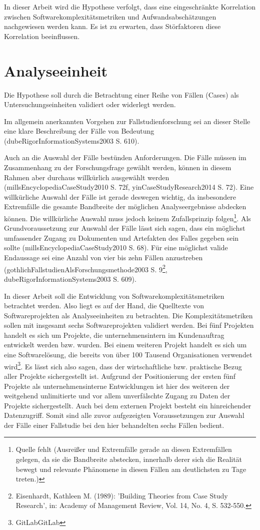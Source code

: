 In dieser Arbeit wird die Hypothese verfolgt, dass eine eingeschränkte
Korrelation zwischen Softwarekomplexitätsmetriken und
Aufwandsabschätzungen nachgewiesen werden kann. Es ist zu erwarten, dass
Störfaktoren diese Korrelation beeinflussen.

\section{Analyseeinheit}\label{analyseeinheit}

Die Hypothese soll durch die Betrachtung einer Reihe von Fällen (Cases)
als Untersuchungseinheiten validiert oder widerlegt werden.

Im allgemein anerkannten Vorgehen zur Fallstudienforschung sei an dieser
Stelle eine klare Beschreibung der Fälle von Bedeutung
(dubeRigorInformationSystems2003 S. 610).

Auch an die Auswahl der Fälle bestünden Anforderungen. Die Fälle müssen
im Zusammenhang zu der Forschungsfrage gewählt werden, können in diesem
Rahmen aber durchaus willkürlich ausgewählt werden
(millsEncyclopediaCaseStudy2010 S. 72f, yinCaseStudyResearch2014 S. 72).
Eine willkürliche Auswahl der Fälle ist gerade deswegen wichtig, da
insbesondere Extremfälle die gesamte Bandbreite der möglichen
Analyseergebnisse abdecken können. Die willkürliche Auswahl muss jedoch
keinem Zufallsprinzip folgen\footnote{Quelle fehlt (Ausreißer und
  Extremfälle gerade an diesen Extremfällen gelegen, da sie die
  Bandbreite abstecken, innerhalb derer sich die Realität bewegt und
  relevante Phänomene in diesen Fällen am deutlichsten zu Tage treten.)}.
Als Grundvoraussetzung zur Auswahl der Fälle lässt sich sagen, dass ein
möglichst umfassender Zugang zu Dokumenten und Artefakten des Falles
gegeben sein sollte (millsEncyclopediaCaseStudy2010 S. 68). Für eine
möglichst valide Endaussage sei eine Anzahl von vier bis zehn Fällen
anzustreben (gothlichFallstudienAlsForschungsmethode2003 S.
9\footnote{Eisenhardt, Kathleen M. (1989): 'Building Theories from Case
  Study Research', in: Academy of Management Review, Vol. 14, No. 4, S.
  532-550.}, dubeRigorInformationSystems2003 S. 609).

In dieser Arbeit soll die Entwicklung von Softwarekomplexitätsmetriken
betrachtet werden. Also liegt es auf der Hand, die Quelltexte von
Softwareprojekten als Analyseeinheiten zu betrachten. Die
Komplexitätsmetriken sollen mit insgesamt sechs Softwareprojekten
validiert werden. Bei fünf Projekten handelt es sich um Projekte, die
unternehmensintern im Kundenauftrag entwickelt werden bzw. wurden. Bei
einem weiteren Projekt handelt es sich um eine Softwarelösung, die
bereits von über 100 Tausend Organisationen verwendet wird\footnote{GitLabGitLab}.
Es lässt sich also sagen, dass der wirtschaftliche bzw. praktische Bezug
aller Projekte sichergestellt ist. Aufgrund der Positionierung der
ersten fünf Projekte als unternehmensinterne Entwicklungen ist hier des
weiteren der weitgehend unlimitierte und vor allem unverfälschte Zugang
zu Daten der Projekte sichergestellt. Auch bei dem externen Projekt
besteht ein hinreichender Datenzugriff. Somit sind alle zuvor
aufgezeigten Voraussetzungen zur Auswahl der Fälle einer Fallstudie bei
den hier behandelten sechs Fällen bedient.

